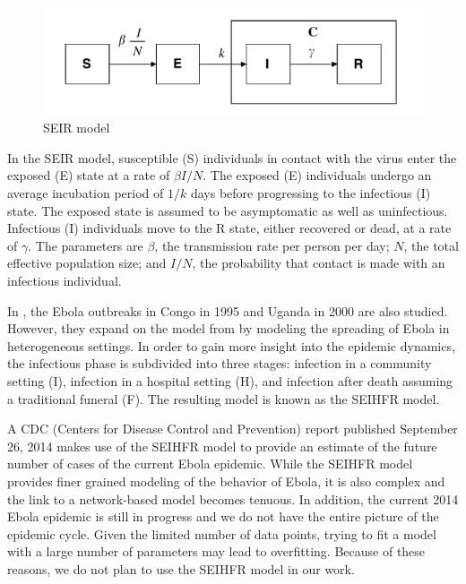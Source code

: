 \documentclass[10pt, journal,onecolumn]{IEEEtran}
\begin{document}
\begin{figure}[h!]
\captionsetup{justification=centering}
\includegraphics[scale=0.3]{seir_model_fig}
\centering\caption{SEIR model}
\label{fig:SEIR_model}
\end{figure}

In the SEIR model, susceptible (S) individuals in contact with the virus enter the exposed (E) state
at a rate of $\beta I / N$.
The exposed (E) individuals undergo an average incubation period of $1/k$ days before progressing to
the infectious (I) state. The exposed state is assumed to be asymptomatic as well as uninfectious.
Infectious (I) individuals move to the R state, either recovered or dead, at a rate of $\gamma$.
 The parameters are $\beta$, the transmission rate per person per day;
$N$, the total effective population size; and $I/N$, the probability that contact is made with
an infectious individual.

In \citep{legrand2007understanding}, the Ebola outbreaks in Congo in 1995 and Uganda in 2000 are
also studied. However, they expand on the model from \citep{chowell2004basic} by modeling the
spreading of Ebola in heterogeneous settings. In order to gain more insight into the epidemic
dynamics, the infectious phase is subdivided into three stages: infection in a community setting
(I), infection in a hospital setting (H), and infection after death assuming a traditional funeral
(F). The resulting model is known as the SEIHFR model.

A CDC (Centers for Disease Control and Prevention) report \citep{meltzer2014estimating} published
September 26, 2014 makes use of the SEIHFR model to provide an estimate of the future number of cases
of the current Ebola epidemic. While the SEIHFR model provides finer grained modeling of the behavior of
Ebola, it is also complex and the link to a network-based model becomes tenuous. In addition, the
current 2014 Ebola epidemic is still in progress and we do not have the entire picture of the
epidemic cycle. Given the limited number of data points, trying to fit a model with a large number of
parameters may lead to overfitting.  Because of these reasons, we do not plan to use the SEIHFR
model in our work.
\end{document}
